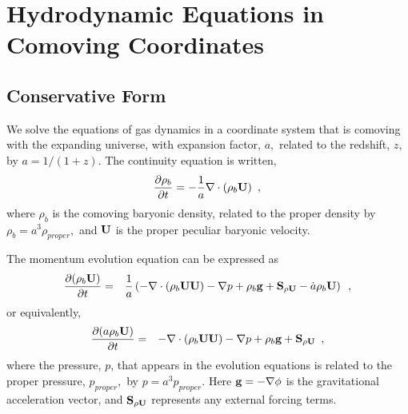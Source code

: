\section{Hydrodynamic Equations in Comoving Coordinates}

\subsection{Conservative Form}

We solve the equations of gas dynamics in a coordinate system that is comoving 
with the expanding universe,  with expansion factor, $a,$ related to the redshift, $z$, by $a = 1 / (1 + z).$
The continuity equation is written,
\begin{equation}
\label{eq:dens}
\frac{\partial \rho_b}{\partial t} = - \frac{1}{a} \nabla \cdot (\rho_b {\bf U}) \enskip , \\
\end{equation}
where $\rho_b$ is the comoving baryonic density, related to the proper density by $\rho_b = a^3 \rho_{proper},$ 
and ${\bf U}$ is the proper peculiar baryonic velocity.

The momentum evolution equation can be expressed as
\begin{eqnarray}
\frac{\partial (\rho_b {\bf U})}{\partial t} &=&  \frac{1}{a} \left(
- \nabla \cdot (\rho_b {\bf U} {\bf U}) 
- \nabla p 
+ \rho_b {\bf g} 
+ {\bf S}_{\rho {\bf U}}
- \dot{a} \rho_b {\bf U} \right) \enskip , 
\end{eqnarray}
or equivalently,
\begin{eqnarray}
\label{eq:momt}
\frac{\partial (a \rho_b {\bf U})}{\partial t} &=& 
-             \nabla \cdot (\rho_b {\bf U} {\bf U}) 
-             \nabla p 
+             \rho_b {\bf g} 
+             {\bf S}_{\rho {\bf U}} \enskip , 
\end{eqnarray}
where the pressure, $p$, that appears in the 
evolution equations is related to the proper pressure, $p_{proper},$ by  $p = a^3 p_{proper}.$ 
Here ${\bf g} = - \nabla \phi$ is the gravitational acceleration vector, and 
${\bf S}_{\rho {\bf U}}$ represents any external forcing terms.

